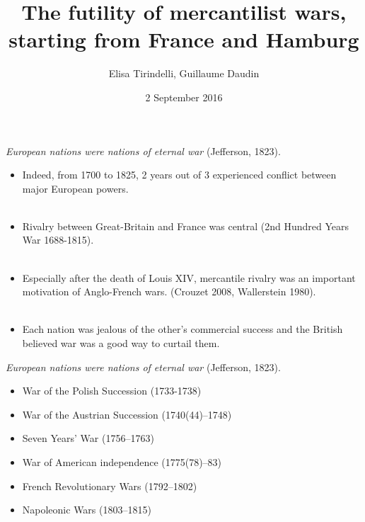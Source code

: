 \documentclass[11pt]{beamer}
\author{Elisa Tirindelli, Guillaume Daudin}
\title{The futility of mercantilist wars, starting from France and Hamburg}
\date{2 September 2016}
\begin{document}
\begin{frame}
\titlepage
\end{frame}


\begin{frame}{\textit{European nations were nations of eternal war} (Jefferson, 1823).}
\begin{itemize}
\item{Indeed, from 1700 to 1825, 2 years out of 3 experienced conflict between major European powers.}\\~\\

\item{Rivalry between Great-Britain and France was central (2nd Hundred Years War 1688-1815).}\\~\\

\item{Especially after the death of Louis XIV, mercantile rivalry was an important motivation of Anglo-French wars. (Crouzet 2008, Wallerstein 1980).}\\~\\

\item{Each nation was jealous of the other's commercial success and the British believed war was a good way to curtail them.}
\end{itemize}
\end{frame}


\begin{frame}{\textit{European nations were nations of eternal war} (Jefferson, 1823).}
\begin{itemize}
\item{War of the Polish Succession (1733-1738)}
\item{War of the Austrian Succession (1740(44)–1748)}
\item{Seven Years' War (1756–1763)}
\item{War of American independence (1775(78)–83)}
\item{French Revolutionary Wars (1792–1802)}
\item{Napoleonic Wars (1803–1815)}
\end{itemize}
\end{frame}
\end{document}
